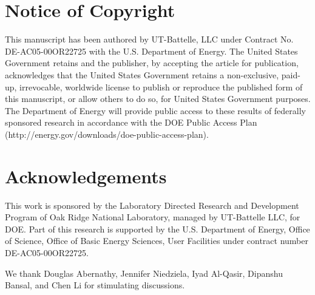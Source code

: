 \documentclass{article}
\begin{document}
\section{Notice of Copyright}\label{notice-of-copyright}

This manuscript has been authored by UT-Battelle, LLC under Contract No.
DE-AC05-00OR22725 with the U.S. Department of Energy. The United States
Government retains and the publisher, by accepting the article for
publication, acknowledges that the United States Government retains a
non-exclusive, paid-up, irrevocable, worldwide license to publish or
reproduce the published form of this manuscript, or allow others to do
so, for United States Government purposes. The Department of Energy will
provide public access to these results of federally sponsored research
in accordance with the DOE Public Access Plan
(http://energy.gov/downloads/doe-public-access-plan).

\section{Acknowledgements}\label{acknowledgements}
This work is sponsored by the Laboratory Directed Research and
Development Program of Oak Ridge National Laboratory, managed by
UT-Battelle LLC, for DOE. Part of this research is supported by the U.S.
Department of Energy, Office of Science, Office of Basic Energy
Sciences, User Facilities under contract number DE-AC05-00OR22725.

We thank Douglas Abernathy, Jennifer Niedziela, Iyad Al-Qasir, 
Dipanshu Bansal, and Chen Li for stimulating discussions.




\end{document}
